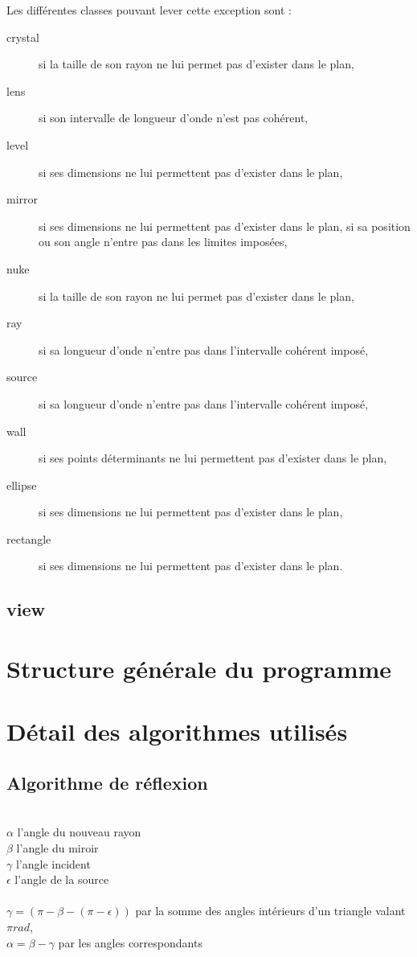 \documentclass[a4paper,11pt]{report}
\begin{document}
Les différentes classes pouvant lever cette exception sont :
\begin{description}
	\item[crystal] si la taille de son rayon ne lui permet pas d'exister dans le
		plan,
	\item[lens] si son intervalle de longueur d'onde n'est pas cohérent,
	\item[level] si ses dimensions ne lui permettent pas d'exister dans le plan,
	\item[mirror] si ses dimensions ne lui permettent pas d'exister dans le
		plan, si sa position ou son angle n'entre pas dans les limites imposées,
	\item[nuke] si la taille de son rayon ne lui permet pas d'exister dans le
		plan,
	\item[ray] si sa longueur d'onde n'entre pas dans l'intervalle cohérent
		imposé,
	\item[source] si sa longueur d'onde n'entre pas dans l'intervalle cohérent
		imposé,
	\item[wall] si ses points déterminants ne lui permettent pas d'exister dans
		le plan,
	\item[ellipse] si ses dimensions ne lui permettent pas d'exister dans le
		plan,
	\item[rectangle] si ses dimensions ne lui permettent pas d'exister dans le
		plan.
\end{description}
\section[Les objets visuels]{view}


\chapter[Structure du programme]{Structure générale du programme}



\chapter[Algorithmes]{Détail des algorithmes utilisés}
\section[Réflexion]{Algorithme de réflexion}
 \\
$\alpha$ l'angle du nouveau rayon \\
$\beta$ l'angle du miroir \\
$\gamma$ l'angle incident \\
$\epsilon$ l'angle de la source \\ \\
$\gamma = (\pi - \beta - (\pi - \epsilon))$ par la somme des angles intérieurs d'un
triangle valant $\pi rad$, \\
$\alpha = \beta - \gamma$ par les angles correspondants
\end{document}
